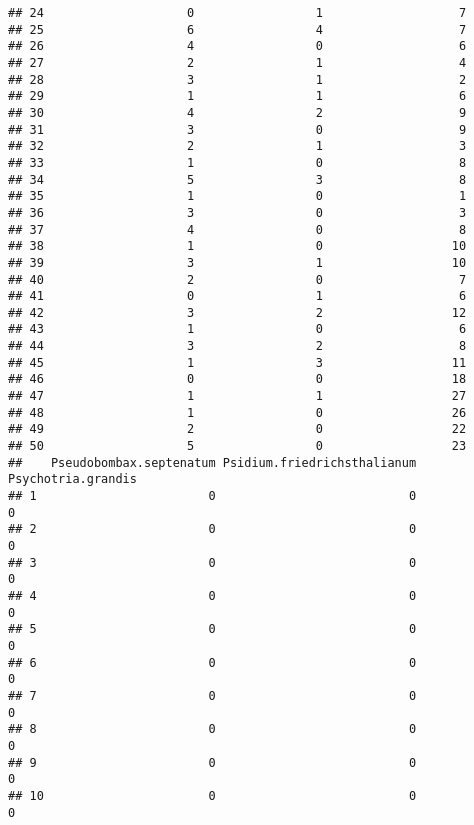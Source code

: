 \documentclass[
]{article}
\begin{document}
\begin{verbatim}
## 24                    0                 1                   7
## 25                    6                 4                   7
## 26                    4                 0                   6
## 27                    2                 1                   4
## 28                    3                 1                   2
## 29                    1                 1                   6
## 30                    4                 2                   9
## 31                    3                 0                   9
## 32                    2                 1                   3
## 33                    1                 0                   8
## 34                    5                 3                   8
## 35                    1                 0                   1
## 36                    3                 0                   3
## 37                    4                 0                   8
## 38                    1                 0                  10
## 39                    3                 1                  10
## 40                    2                 0                   7
## 41                    0                 1                   6
## 42                    3                 2                  12
## 43                    1                 0                   6
## 44                    3                 2                   8
## 45                    1                 3                  11
## 46                    0                 0                  18
## 47                    1                 1                  27
## 48                    1                 0                  26
## 49                    2                 0                  22
## 50                    5                 0                  23
##    Pseudobombax.septenatum Psidium.friedrichsthalianum Psychotria.grandis
## 1                        0                           0                  0
## 2                        0                           0                  0
## 3                        0                           0                  0
## 4                        0                           0                  0
## 5                        0                           0                  0
## 6                        0                           0                  0
## 7                        0                           0                  0
## 8                        0                           0                  0
## 9                        0                           0                  0
## 10                       0                           0                  0

\end{verbatim}
\end{document}
